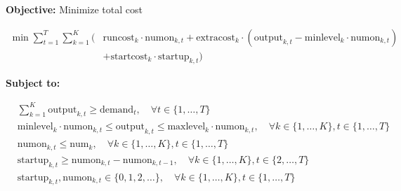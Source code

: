 \documentclass{article}
\begin{document}
\textbf{Objective:} Minimize total cost

\begin{align}
    \min \sum_{t=1}^{T} \sum_{k=1}^{K} \Big( & \text{runcost}_k \cdot \text{numon}_{k,t} + \text{extracost}_k \cdot (\text{output}_{k,t} - \text{minlevel}_k \cdot \text{numon}_{k,t}) \\
    & + \text{startcost}_k \cdot \text{startup}_{k,t} \Big)
\end{align}

\textbf{Subject to:}

\begin{align}
    & \sum_{k=1}^{K} \text{output}_{k,t} \geq \text{demand}_t, \quad \forall t \in \{1, \ldots, T\} \\
    & \text{minlevel}_{k} \cdot \text{numon}_{k,t} \leq \text{output}_{k,t} \leq \text{maxlevel}_{k} \cdot \text{numon}_{k,t}, \quad \forall k \in \{1, \ldots, K\}, t \in \{1, \ldots, T\} \\
    & \text{numon}_{k,t} \leq \text{num}_{k}, \quad \forall k \in \{1, \ldots, K\}, t \in \{1, \ldots, T\} \\
    & \text{startup}_{k,t} \geq \text{numon}_{k,t} - \text{numon}_{k,t-1}, \quad \forall k \in \{1, \ldots, K\}, t \in \{2, \ldots, T\} \\
    & \text{startup}_{k,t}, \text{numon}_{k,t} \in \{0, 1, 2, \ldots\}, \quad \forall k \in \{1, \ldots, K\}, t \in \{1, \ldots, T\}
\end{align}
\end{document}
